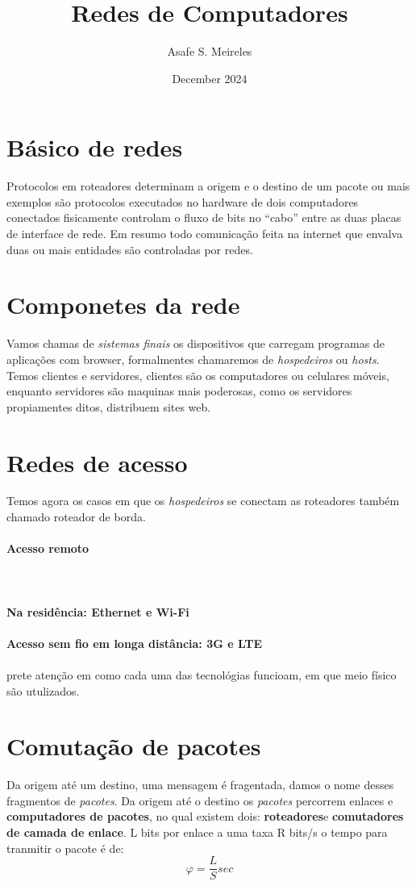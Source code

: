 \documentclass{article}
\title{Redes de Computadores}
\author{Asafe S. Meireles}
\date{December 2024}
\begin{document}
\section{Básico de redes}
Protocolos em roteadores determinam a origem e o destino de um pacote ou mais exemplos são protocolos executados no hardware de dois computadores conectados fisicamente controlam o fluxo de
bits no “cabo” entre as duas placas de interface de rede. 
Em resumo todo comunicação feita na internet que envalva duas ou mais entidades são controladas por redes. 

\section{Componetes da rede}
Vamos chamas de \textit{sistemas finais} os dispositivos que carregam programas de aplicações com browser, formalmentes chamaremos de \textit{hospedeiros} ou \textit{hosts}.
Temos clientes e servidores, clientes são os computadores ou celulares móveis, enquanto servidores são maquinas mais poderosas, como os servidores propiamentes ditos, distribuem sites web.

\section{Redes de acesso}
Temos agora os casos em que os \textit{hospedeiros} se conectam as roteadores também chamado roteador de borda.
\\\\
\textbf{Acesso remoto}
\\\\
\\\\
\textbf{Na residência: Ethernet e Wi-Fi}
\\\\
\textbf{Acesso sem fio em longa distância: 3G e LTE}\\\\
prete atenção em como cada uma das tecnológias funcioam, em que meio físico são utulizados.

\section{Comutação de pacotes}
Da origem até um destino, uma mensagem é fragentada, damos o nome desses fragmentos de \textit{pacotes}. 
Da origem até o destino os \textit{pacotes} percorrem enlaces e \textbf{computadores de pacotes}, no qual existem dois: \textbf{roteadores}e \textbf{comutadores de camada de enlace}.
L bits por enlace a uma taxa R bits/s o tempo para tranmitir o pacote é de:
$$ \varphi = \frac{L}{S}sec $$
\end{document}
